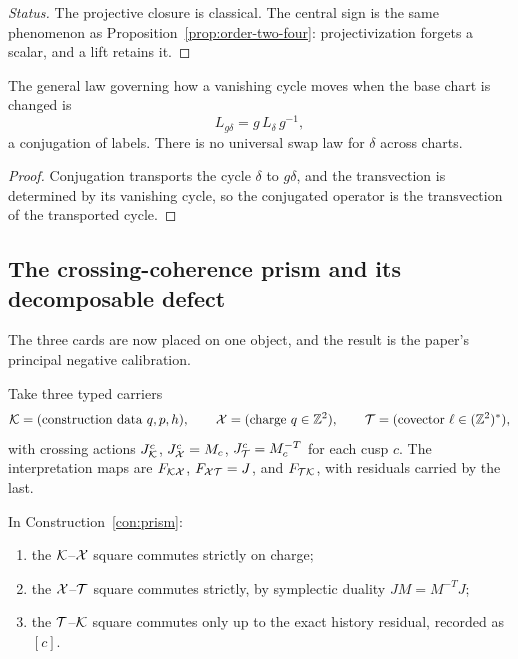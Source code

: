 \begin{proof}[Status]
The projective closure is classical.  The central sign is the same phenomenon as
Proposition~\ref{prop:order-two-four}: projectivization forgets a scalar, and a lift
retains it.
\end{proof}

\begin{proposition}\label{prop:label-transport}
The general law governing how a vanishing cycle moves when the base chart is changed is
\[
  L_{g\delta}=g\,L_\delta\,g^{-1},
\]
a conjugation of labels.  There is no universal swap law for $\delta$ across charts.
\end{proposition}

\begin{proof}
Conjugation transports the cycle $\delta$ to $g\delta$, and the transvection is
determined by its vanishing cycle, so the conjugated operator is the transvection of the
transported cycle.
\end{proof}

\subsection{The crossing-coherence prism and its decomposable defect}

The three cards are now placed on one object, and the result is the paper's principal
negative calibration.

\begin{construction}\label{con:prism}
Take three typed carriers
\[
  \mathcal K=(\text{construction data }q,p,h),\qquad
  \mathcal X=(\text{charge }q\in\mathbb{Z}^{2}),\qquad
  \mathcal T=(\text{covector }\ell\in(\mathbb{Z}^{2})^{\ast}),
\]
with crossing actions $J^{c}_{\mathcal K}$, $J^{c}_{\mathcal X}=M_c$, $J^{c}_{\mathcal T}=M_c^{-T}$ for each
cusp $c$.  The interpretation maps are $F_{\mathcal K\mathcal X}$, $F_{\mathcal X\mathcal T}=J$, and $F_{\mathcal T\mathcal K}$,
with residuals carried by the last.
\end{construction}

\begin{theorem}\label{thm:crossing-squares}
In Construction~\ref{con:prism}:
\begin{enumerate}
\item the $\mathcal K$--$\mathcal X$ square commutes strictly on charge;
\item the $\mathcal X$--$\mathcal T$ square commutes strictly, by symplectic duality
  $JM=M^{-T}J$;
\item the $\mathcal T$--$\mathcal K$ square commutes only up to the exact history residual, recorded
  as $[c]$.
\end{enumerate}
\end{theorem}

